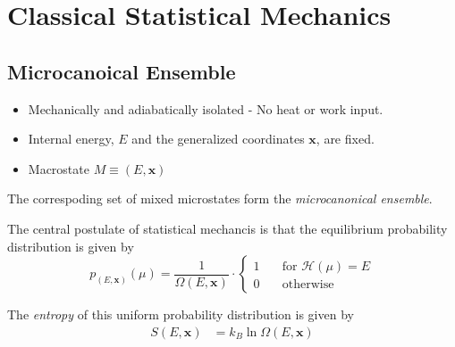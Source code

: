 \documentclass[a4paper]{report}
\renewcommand\vec\bm
\begin{document}
\chapter{Classical Statistical Mechanics}

\section{Microcanoical Ensemble}
\begin{itemize}
    \item Mechanically and adiabatically isolated - No heat or work input.
    \item Internal energy, $E$ and the generalized coordinates $\vec x$, are fixed. 
    \item Macrostate $M \equiv (E,\vec x)$
\end{itemize}

The correspoding set of mixed microstates form the \emph{microcanonical ensemble}. 

The central postulate of statistical mechancis is that the equilibrium probability distribution is given by
\begin{equation}
    p_{(E,\vec x)}(\mu) = \frac{1}{\Omega(E,\vec x)} \cdot 
    \begin{cases}
       1\quad & \text{for } \mathcal H(\mu) = E \\
       0\quad & \text{otherwise}
    \end{cases}
\end{equation}


The \emph{entropy} of this uniform probability distribution is given by 
\begin{align*}
    S(E,\vec x) &= k_B \ln{\Omega(E,\vec x)}
\end{align*}
\end{document}
